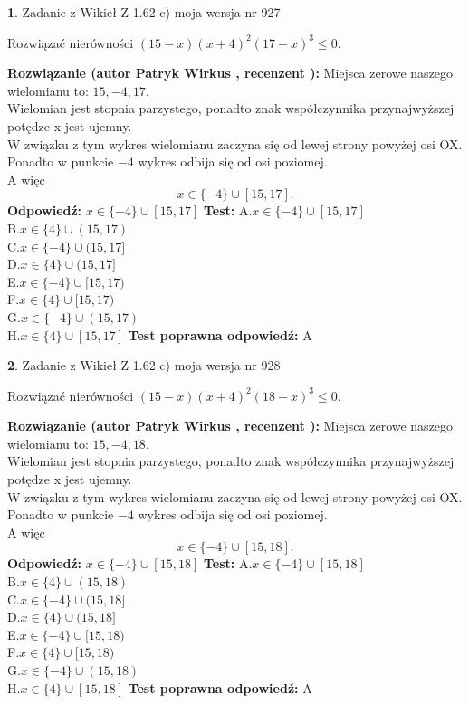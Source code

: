 \documentclass[12pt, a4paper]{article}
\theoremstyle{definition} %
\newtheorem{zad}{}
\newcommand{\zadStart}[1]{\begin{zad}#1\newline}
\newcommand{\zadStop}{\end{zad}}
\newcommand{\rozwStart}[2]{\noindent \textbf{Rozwiązanie (autor #1 , recenzent #2): }\newline}
\newcommand{\rozwStop}{\newline}
\newcommand{\odpStart}{\noindent \textbf{Odpowiedź:}\newline}
\newcommand{\odpStop}{\newline}
\newcommand{\testStart}{\noindent \textbf{Test:}\newline}
\newcommand{\testStop}{\newline}
\newcommand{\kluczStart}{\noindent \textbf{Test poprawna odpowiedź:}\newline}
\newcommand{\kluczStop}{\newline}
\begin{document}
\zadStart{Zadanie z Wikieł Z 1.62 c) moja wersja nr 927}

Rozwiązać nierówności $(15-x)(x+4)^{2}(17-x)^{3}\le0$.
\zadStop
\rozwStart{Patryk Wirkus}{}
Miejsca zerowe naszego wielomianu to: $15, -4, 17$.\\
Wielomian jest stopnia parzystego, ponadto znak współczynnika przy\linebreak najwyższej potędze x jest ujemny.\\ W związku z tym wykres wielomianu zaczyna się od lewej strony powyżej osi OX.\\
Ponadto w punkcie $-4$ wykres odbija się od osi poziomej.\\
A więc $$x \in \{-4\} \cup [15,17].$$
\rozwStop
\odpStart
$x \in \{-4\} \cup [15,17]$
\odpStop
\testStart
A.$x \in \{-4\} \cup [15,17]$\\
B.$x \in \{4\} \cup (15,17)$\\
C.$x \in \{-4\} \cup (15,17]$\\
D.$x \in \{4\} \cup (15,17]$\\
E.$x \in \{-4\} \cup [15,17)$\\
F.$x \in \{4\} \cup [15,17)$\\
G.$x \in \{-4\} \cup (15,17)$\\
H.$x \in \{4\} \cup [15,17]$
\testStop
\kluczStart
A
\kluczStop



\zadStart{Zadanie z Wikieł Z 1.62 c) moja wersja nr 928}

Rozwiązać nierówności $(15-x)(x+4)^{2}(18-x)^{3}\le0$.
\zadStop
\rozwStart{Patryk Wirkus}{}
Miejsca zerowe naszego wielomianu to: $15, -4, 18$.\\
Wielomian jest stopnia parzystego, ponadto znak współczynnika przy\linebreak najwyższej potędze x jest ujemny.\\ W związku z tym wykres wielomianu zaczyna się od lewej strony powyżej osi OX.\\
Ponadto w punkcie $-4$ wykres odbija się od osi poziomej.\\
A więc $$x \in \{-4\} \cup [15,18].$$
\rozwStop
\odpStart
$x \in \{-4\} \cup [15,18]$
\odpStop
\testStart
A.$x \in \{-4\} \cup [15,18]$\\
B.$x \in \{4\} \cup (15,18)$\\
C.$x \in \{-4\} \cup (15,18]$\\
D.$x \in \{4\} \cup (15,18]$\\
E.$x \in \{-4\} \cup [15,18)$\\
F.$x \in \{4\} \cup [15,18)$\\
G.$x \in \{-4\} \cup (15,18)$\\
H.$x \in \{4\} \cup [15,18]$
\testStop
\kluczStart
A
\kluczStop
\end{document}
